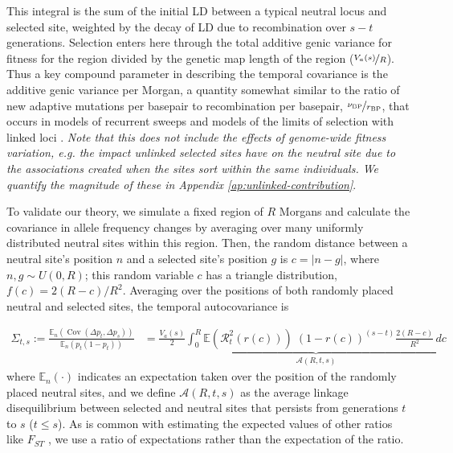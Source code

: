 \documentclass[11pt]{article}
\newcommand{\vb}[1]{{\it \color{blue} #1}}
\newcommand{\E}{\mathbb{E}}
\DeclareMathOperator{\cov}{Cov}
\begin{document}
This integral is the sum of the initial LD between a typical neutral locus and
selected site, weighted by the decay of LD due to recombination over $s-t$
generations. Selection enters here through the total additive genic variance
for fitness for the region divided by the genetic map length of the region
($\nicefrac{V_a(s)}{R}$). Thus a key compound parameter in describing the
temporal covariance is the additive genic variance per Morgan, a quantity
somewhat similar to the ratio of new adaptive mutations per basepair to
recombination per basepair, $\nicefrac{\nu_\text{BP}}{r_\text{BP}}$, that
occurs in models of recurrent sweeps \parencite{Stephan1992-jc} and models of
the limits of selection with linked loci
\parencite{Robertson1970-xk,Robertson1976-la}. \vb{Note that this does not
  include the effects of genome-wide fitness variation, e.g. the impact
  unlinked selected sites have on the neutral site due to the associations
created when the sites sort within the same individuals. We quantify the
magnitude of these in Appendix \ref{ap:unlinked-contribution}}.


To validate our theory, we simulate a fixed region of $R$ Morgans and
calculate the covariance in allele frequency changes by averaging over many
uniformly distributed neutral sites within this region. Then, the random
distance between a neutral site's position $n$ and a selected site's position
$g$ is $c = |n - g|$, where $n, g \sim U(0, R)$; this random variable $c$ has a
triangle distribution, $f(c) = 2(R-c) / R^2$. Averaging over the positions of
both randomly placed neutral and selected sites, the temporal autocovariance
is

\begin{align}
  \label{eq:multilocus-triangle}
  \Sigma_{t,s} := \frac{\E_n(\cov(\Delta p_t, \Delta p_s))}{\E_n(p_{t} (1-p_{t}))} &= \frac{V_a(s)}{2} \underbrace{\int_0^R \E(\mathcal{R}_t^2(r(c))) \; (1-r(c))^{(s-t)} \frac{2(R-c)}{R^2} \,d c}_{\mathcal{A}(R, t, s)} 
\end{align}
%
where $\E_n(\cdot)$ indicates an expectation taken over the position of the
randomly placed neutral sites, and we define $\mathcal{A}(R, t, s)$ as the
average linkage disequilibrium between selected and neutral sites that persists
from generations $t$ to $s$ ($t \le s$). As is common with estimating the
expected values of other ratios like $F_{ST}$ \parencite{Bhatia2013-zy}, we use
a ratio of expectations rather than the expectation of the ratio.
\end{document}
